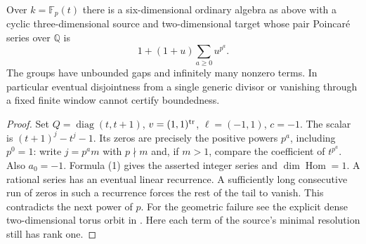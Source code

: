 \documentclass[11pt]{article}
\begin{document}
\begin{cor}\label{frobenius}
Over $k=\mathbb F_p(t)$ there is a six-dimensional ordinary algebra
as above with a cyclic three-dimensional source and two-dimensional
target whose pair Poincar\'e series over $\mathbb Q$ is
\[
         1+(1+u)\sum_{a\ge0}u^{p^a}.
\]
The groups have unbounded gaps and infinitely many nonzero terms.
In particular eventual disjointness from a single generic divisor
or vanishing through a fixed finite window cannot certify boundedness.
\end{cor}
\begin{proof}
Set $Q=\operatorname{diag}(t,t+1)$, $v=(1,1)^{\rm tr}$,
$\ell=(-1,1)$, $c=-1$. The scalar is
$(t+1)^j-t^j-1$. Its zeros are precisely the positive powers
$p^a$, including $p^0=1$: write $j=p^a m$ with $p\nmid m$ and,
if $m>1$, compare the coefficient of $t^{p^a}$. Also $a_0=-1$.
Formula (1) gives the asserted integer series and $\dim\operatorname{Hom}=1$.
A rational series has an eventual linear recurrence. A sufficiently
long consecutive run of zeros in such a recurrence forces the rest
of the tail to vanish. This contradicts the next power of $p$.
For the geometric failure see the explicit dense two-dimensional
torus orbit in . Here each term of the source's minimal
resolution still has rank one.
\end{proof}
\end{document}

